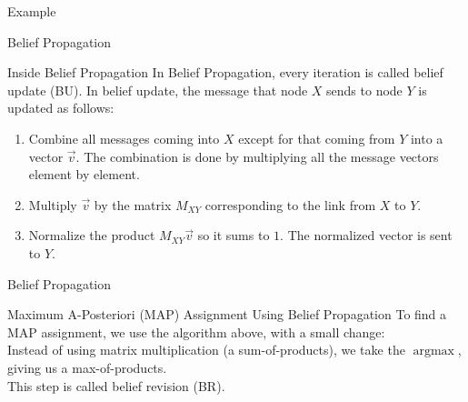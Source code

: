 \documentclass{beamer}
\begin{document}
\begin{frame}{Example}
\begin{onlyenv}
\begin{figure}[h]
        \end{figure}
    \end{onlyenv}
\end{frame}
\begin{frame}{Belief Propagation}
    \pause
    \begin{block}{Inside Belief Propagation}
        In Belief Propagation, every iteration is called \alert{belief update (BU)}. In belief update, the message
        that node $ X $ sends to node $ Y $ is updated as follows:
        \pause
        \begin{enumerate}[<+->]
            \item Combine all messages coming into $ X $ except for that coming from $ Y $ into a vector $ \vec{v} $. The combination is done by multiplying all the message vectors element by element.
            \item Multiply $ \vec{v} $ by the matrix $ M_{XY} $ corresponding to the link from $ X $ to $ Y $.
            \item Normalize the product $ M_{XY}\vec{v} $ so it sums to $ 1 $. The normalized vector is sent to $ Y $.
        \end{enumerate}
    \end{block}
\end{frame}
\begin{frame}{Belief Propagation}
    \begin{block}{Maximum A-Posteriori (MAP) Assignment Using Belief Propagation}
        To find a MAP assignment, we use the algorithm above, with a small change:\\
        Instead of using matrix multiplication (a sum-of-products), we take the $ \operatorname{argmax} $, giving us a max-of-products.\\
        This step is called \alert{belief revision (BR)}.
    \end{block}
\end{frame}
\end{document}
